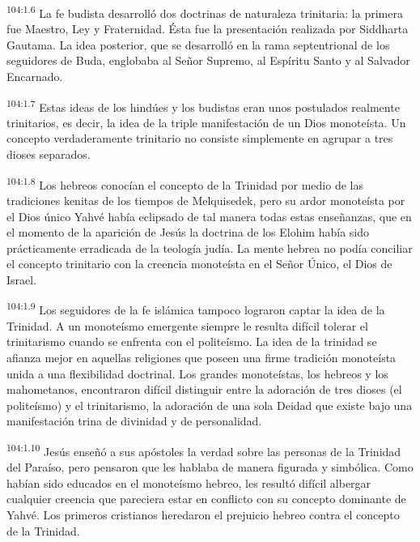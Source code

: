 \par
\textsuperscript{104:1.6} La fe budista desarrolló dos doctrinas de naturaleza trinitaria: la primera fue Maestro, Ley y Fraternidad. Ésta fue la presentación realizada por Siddharta Gautama. La idea posterior, que se desarrolló en la rama septentrional de los seguidores de Buda, englobaba al Señor Supremo, al Espíritu Santo y al Salvador Encarnado.

\par
\textsuperscript{104:1.7} Estas ideas de los hindúes y los budistas eran unos postulados realmente trinitarios, es decir, la idea de la triple manifestación de un Dios monoteísta. Un concepto verdaderamente trinitario no consiste simplemente en agrupar a tres dioses separados.

\par
\textsuperscript{104:1.8} Los hebreos conocían el concepto de la Trinidad por medio de las tradiciones kenitas de los tiempos de Melquisedek, pero su ardor monoteísta por el Dios único Yahvé había eclipsado de tal manera todas estas enseñanzas, que en el momento de la aparición de Jesús la doctrina de los Elohim había sido prácticamente erradicada de la teología judía. La mente hebrea no podía conciliar el concepto trinitario con la creencia monoteísta en el Señor Único, el Dios de Israel.

\par
\textsuperscript{104:1.9} Los seguidores de la fe islámica tampoco lograron captar la idea de la Trinidad. A un monoteísmo emergente siempre le resulta difícil tolerar el trinitarismo cuando se enfrenta con el politeísmo. La idea de la trinidad se afianza mejor en aquellas religiones que poseen una firme tradición monoteísta unida a una flexibilidad doctrinal. Los grandes monoteístas, los hebreos y los mahometanos, encontraron difícil distinguir entre la adoración de tres dioses (el politeísmo) y el trinitarismo, la adoración de una sola Deidad que existe bajo una manifestación trina de divinidad y de personalidad.

\par
\textsuperscript{104:1.10} Jesús enseñó a sus apóstoles la verdad sobre las personas de la Trinidad del Paraíso, pero pensaron que les hablaba de manera figurada y simbólica. Como habían sido educados en el monoteísmo hebreo, les resultó difícil albergar cualquier creencia que pareciera estar en conflicto con su concepto dominante de Yahvé. Los primeros cristianos heredaron el prejuicio hebreo contra el concepto de la Trinidad.

